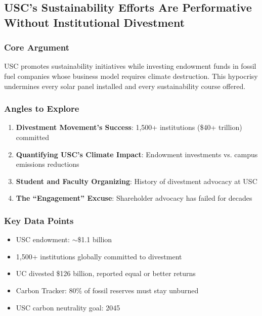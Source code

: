 \documentclass[11pt,letterpaper]{article}
\begin{document}
\newpage
\subsection{USC's Sustainability Efforts Are Performative Without Institutional Divestment}

\subsubsection*{Core Argument}
USC promotes sustainability initiatives while investing endowment funds in fossil fuel companies whose business model requires climate destruction. This hypocrisy undermines every solar panel installed and every sustainability course offered.

\subsubsection*{Angles to Explore}
\begin{enumerate}[noitemsep]
    \item \textbf{Divestment Movement's Success}: 1,500+ institutions (\$40+ trillion) committed
    \item \textbf{Quantifying USC's Climate Impact}: Endowment investments vs. campus emissions reductions
    \item \textbf{Student and Faculty Organizing}: History of divestment advocacy at USC
    \item \textbf{The ``Engagement'' Excuse}: Shareholder advocacy has failed for decades
\end{enumerate}

\subsubsection*{Key Data Points}
\begin{itemize}[noitemsep]
    \item USC endowment: $\sim$\$1.1 billion
    \item 1,500+ institutions globally committed to divestment
    \item UC divested \$126 billion, reported equal or better returns
    \item Carbon Tracker: 80\% of fossil reserves must stay unburned
    \item USC carbon neutrality goal: 2045
\end{itemize}
\end{document}
